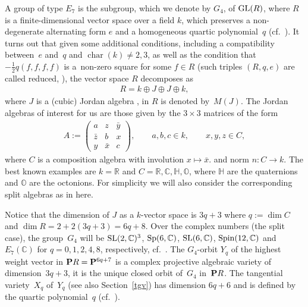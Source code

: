 \documentclass[pdftex]{sigma}
\newcommand{\RR}{{\mathbb R}}
\newcommand{\CC}{{\mathbb C}}
\newcommand{\HH}{{\mathbb H}}
\newcommand{\OO}{{\mathbb O}}
\newcommand{\PP}{{\bf P}}
\numberwithin{equation}{section}
\begin{document}
A group of type $E_7$ is the subgroup, which we denote by $G_4$, of ${\rm GL}(R)$, where $R$ is a finite-dimensional vector space over a field $k$, which preserves a non-degenerate alternating form $e$ and a homogeneous quartic polynomial~$q$ (cf.~\cite{Brown,Kru}). It turns out that given some additional conditions, including a compatibility between~$e$ and~$q$ and $\operatorname{char}(k)\ne 2,3$, as well as the condition that $- \frac{1}{2} q(f,f,f,f)$ is a~non-zero square for some $f\in R$ (such triples $(R,q,e)$ are called reduced, \cite[p.~90]{Brown}), the vector space $R$ decomposes as
\begin{gather*}
R = k\oplus J \oplus J \oplus k,
\end{gather*}
where $J$ is a (cubic) Jordan algebra \cite{ja}, in \cite[Section~3.1]{Kru} $R$ is denoted by~$M(J)$. The Jordan algebras of interest for us are those given by the $3\times 3$ matrices of the form
\begin{gather*}
A := \begin{pmatrix} a&z&\bar{y}\\\bar{z}&b&x\\y&\bar{x}&c\end{pmatrix},\qquad a,b,c\in k,\qquad x,y,z\in C,
\end{gather*}
where   $C$ is a composition algebra with involution $x\mapsto \bar{x}$. and norm $n\colon C\rightarrow k$. The best known examples are $k=\RR$ and $C=\RR,\CC,\HH,\OO$, where $\HH$ are the quaternions and $\OO$ are the octonions. For simplicity we will also consider the corresponding split algebras as in \cite[Section~2.1]{Kru} here.

 Notice that the dimension of $J$ as a $k$-vector space is $3q+3$ where $q:=\dim C$ and $\dim R=2+2(3q+3)=6q+8$. Over the complex numbers (the split case), the group~$G_4$ will be ${\rm SL}(2,\CC)^3$, ${\rm Sp}(6,\CC)$, ${\rm SL}(6,\CC)$, ${\rm Spin}(12,\CC)$ and $E_7(\CC)$ for $q=0,1,2,4,8$, respectively, cf.\ \cite[Table~3]{Holweck}. The $G_4$-orbit $Y_q$ of the highest weight vector in $\PP R=\PP^{6q+7}$ is a complex projective algebraic variety of dimension~$3q+3$, it is the unique closed orbit of~$G_4$ in~$\PP R$. The tangential variety~$X_q$ of~$Y_q$ (see also Section~\ref{tgv}) has dimension $6q+6$ and is defined by the quartic polynomial~$q$ (cf.~\cite{FGK,Holweck,LM}).
\end{document}
